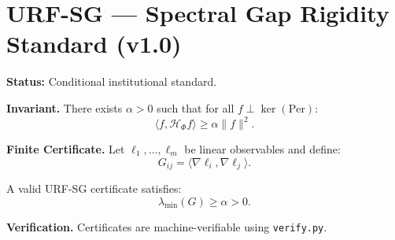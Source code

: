 \documentclass[11pt]{article}
\begin{document}
\section*{URF-SG — Spectral Gap Rigidity Standard (v1.0)}

\textbf{Status:} Conditional institutional standard.

\textbf{Invariant.}
There exists $\alpha>0$ such that for all
$f\perp\ker(\mathrm{Per})$:
\[
\langle f,\mathcal H_\Phi f\rangle \ge \alpha \|f\|^2.
\]

\textbf{Finite Certificate.}
Let $\ell_1,\dots,\ell_m$ be linear observables and define:
\[
G_{ij}=\langle \nabla \ell_i,\nabla \ell_j\rangle.
\]

A valid URF-SG certificate satisfies:
\[
\lambda_{\min}(G) \ge \alpha > 0.
\]

\textbf{Verification.}
Certificates are machine-verifiable using \texttt{verify.py}.
\end{document}
